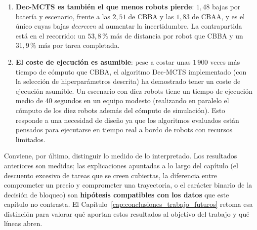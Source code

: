 \begin{enumerate}
    \item \textbf{Dec-MCTS es también el que menos robots pierde}: $1{,}48$ bajas por batería y escenario, frente a las $2{,}51$ de CBBA y las $1{,}83$ de CBAA, y es el único cuyas bajas \emph{decrecen} al aumentar la incertidumbre. La contrapartida está en el recorrido: un $53{,}8\,\text{\%}$ más de distancia por robot que CBBA y un $31{,}9\,\text{\%}$ más por tarea completada.
    \item \textbf{El coste de ejecución es asumible}: pese a costar unas $1\,900$ veces más tiempo de cómputo que CBBA, el algoritmo Dec-MCTS implementado (con la selección de hiperparámetros descrita) ha demostrado tener un coste de ejecución asumible. Un escenario con diez robots tiene un tiempo de ejecución medio de 40 segundos en un equipo modesto (realizando en paralelo el cómputo de los diez robots además del cómputo de simulación). Esto responde a una necesidad de diseño ya que los algoritmos evaluados están pensados para ejecutarse en tiempo real a bordo de robots con recursos limitados.
\end{enumerate}


Conviene, por último, distinguir lo medido de lo interpretado. Los resultados anteriores son medidas; las explicaciones apuntadas a lo largo del capítulo (el descuento excesivo de tareas que se creen cubiertas, la diferencia entre comprometer un precio y comprometer una trayectoria, o el carácter binario de la decisión de bloqueo) son \textbf{hipótesis compatibles con los datos} que este capítulo no contrasta. El Capítulo~\ref{cap:conclusiones_trabajo_futuros} retoma esa distinción para valorar qué aportan estos resultados al objetivo del trabajo y qué líneas abren.
